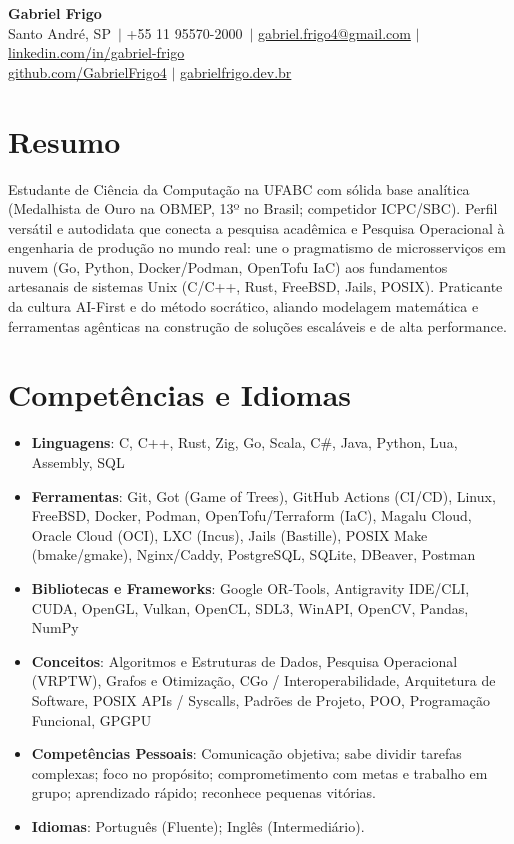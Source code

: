 \documentclass[letterpaper,10pt]{article}
\makeatletter
\newcommand{\resumeItem}[1]{\item\small{#1}}
\newcommand{\resumeSubHeadingList}{\begin{itemize}[leftmargin=0.15in, label={}]}
\newcommand{\resumeSubHeadingListEnd}{\end{itemize}}
\newcommand{\candidateName}{Gabriel Frigo}
\newcommand{\candidateLocation}{Santo André, SP}
\newcommand{\candidatePhone}{+55 11 95570-2000}
\newcommand{\candidateEmail}{gabriel.frigo4@gmail.com}
\newcommand{\candidateLinkedInUser}{gabriel-frigo}
\newcommand{\candidateLinkedInURL}{https://linkedin.com/in/gabriel-frigo-b6727b275/}
\newcommand{\candidateGitHubUser}{GabrielFrigo4}
\newcommand{\candidateGitHubURL}{https://github.com/GabrielFrigo4}
\newcommand{\candidateWebsite}{gabrielfrigo.dev.br}
\newcommand{\candidateWebsiteURL}{https://gabrielfrigo.dev.br}
\makeatother
\begin{document}
\begin{center}
  \textbf{\Huge \candidateName} \\ \vspace{3pt}
  \small \candidateLocation\ $|$ \candidatePhone\ $|$ \href{mailto:\candidateEmail}{\candidateEmail} $|$
  \href{\candidateLinkedInURL}{linkedin.com/in/\candidateLinkedInUser} \\
  \href{\candidateGitHubURL}{github.com/\candidateGitHubUser} $|$
  \href{\candidateWebsiteURL}{\candidateWebsite}
\end{center}

\section{Resumo}
Estudante de Ciência da Computação na UFABC com sólida base analítica (Medalhista de Ouro na OBMEP, 13º no Brasil; competidor ICPC/SBC). Perfil versátil e autodidata que conecta a pesquisa acadêmica e Pesquisa Operacional à engenharia de produção no mundo real: une o pragmatismo de microsserviços em nuvem (Go, Python, Docker/Podman, OpenTofu IaC) aos fundamentos artesanais de sistemas Unix (C/C++, Rust, FreeBSD, Jails, POSIX). Praticante da cultura AI-First e do método socrático, aliando modelagem matemática e ferramentas agênticas na construção de soluções escaláveis e de alta performance.

\section{Competências e Idiomas}
\resumeSubHeadingList
  \resumeItem{\textbf{Linguagens}: C, C++, Rust, Zig, Go, Scala, C\#, Java, Python, Lua, Assembly, SQL}
  \resumeItem{\textbf{Ferramentas}: Git, Got (Game of Trees), GitHub Actions (CI/CD), Linux, FreeBSD, Docker, Podman, OpenTofu/Terraform (IaC), Magalu Cloud, Oracle Cloud (OCI), LXC (Incus), Jails (Bastille), POSIX Make (bmake/gmake), Nginx/Caddy, PostgreSQL, SQLite, DBeaver, Postman}
  \resumeItem{\textbf{Bibliotecas e Frameworks}: Google OR-Tools, Antigravity IDE/CLI, CUDA, OpenGL, Vulkan, OpenCL, SDL3, WinAPI, OpenCV, Pandas, NumPy}
  \resumeItem{\textbf{Conceitos}: Algoritmos e Estruturas de Dados, Pesquisa Operacional (VRPTW), Grafos e Otimização, CGo / Interoperabilidade, Arquitetura de Software, POSIX APIs / Syscalls, Padrões de Projeto, POO, Programação Funcional, GPGPU}
  \resumeItem{\textbf{Competências Pessoais}: Comunicação objetiva; sabe dividir tarefas complexas; foco no propósito; comprometimento com metas e trabalho em grupo; aprendizado rápido; reconhece pequenas vitórias.}
  \resumeItem{\textbf{Idiomas}: Português (Fluente); Inglês (Intermediário).}
\resumeSubHeadingListEnd
\end{document}
